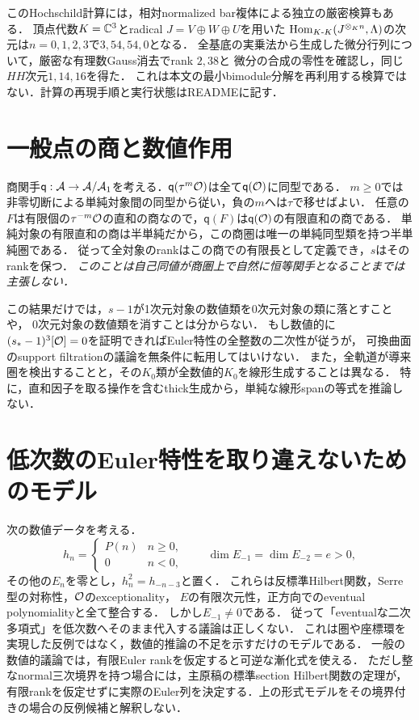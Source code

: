 \documentclass[11pt,a4paper]{ltjsarticle}
\begin{document}
このHochschild計算には，相対normalized bar複体による独立の厳密検算もある．
頂点代数$K=\mathbb C^3$とradical $J=V\oplus W\oplus U$を用いた
$\operatorname{Hom}_{K\text{-}K}(J^{\otimes_K n},\Lambda)$の次元は$n=0,1,2,3$で$3,54,54,0$となる．
全基底の実乗法から生成した微分行列について，厳密な有理数Gauss消去でrank $2,38$と
微分の合成の零性を確認し，同じ$HH$次元$1,14,16$を得た．
これは本文の最小bimodule分解を再利用する検算ではない．計算の再現手順と実行状態はREADMEに記す．


\section{一般点の商と数値作用}
商関手$\mathsf q:\mathcal A\to\mathcal A/\mathcal A_1$を考える．$\mathsf q(\tau^m\mathcal O)$は全て$\mathsf q(\mathcal O)$に同型である．
$m\geq0$では非零切断による単純対象間の同型から従い，負の$m$へは$\tau$で移せばよい．
任意の$F$は有限個の$\tau^{-m}\mathcal O$の直和の商なので，$\mathsf q(F)$は$\mathsf q(\mathcal O)$の有限直和の商である．
単純対象の有限直和の商は半単純だから，この商圏は唯一の単純同型類を持つ半単純圏である．
従って全対象のrankはこの商での有限長として定義でき，$s$はそのrankを保つ．
\emph{このことは自己同値が商圏上で自然に恒等関手となることまでは主張しない．}

この結果だけでは，$s-1$が1次元対象の数値類を0次元対象の類に落とすことや，
0次元対象の数値類を消すことは分からない．
もし数値的に$(s_*-1)^3[\mathcal O]=0$を証明できればEuler特性の全整数の二次性が従うが，
可換曲面のsupport filtrationの議論を無条件に転用してはいけない．
また，全軌道が導来圏を検出することと，その$K_0$類が全数値的$K_0$を線形生成することは異なる．
特に，直和因子を取る操作を含むthick生成から，単純な線形spanの等式を推論しない．

\section{低次数のEuler特性を取り違えないためのモデル}
次の数値データを考える．
\[
 h_n=\begin{cases}P(n)&n\geq0,\\0&n<0,\end{cases}
 \qquad \dim E_{-1}=\dim E_{-2}=e>0,
\]
その他の$E_n$を零とし，$h^2_n=h_{-n-3}$と置く．
これらは反標準Hilbert関数，Serre型の対称性，$\mathcal O$のexceptionality，
$E$の有限次元性，正方向でのeventual polynomialityと全て整合する．
しかし$E_{-1}\ne0$である．
従って「eventualな二次多項式」を低次数へそのまま代入する議論は正しくない．
これは圏や座標環を実現した反例ではなく，数値的推論の不足を示すだけのモデルである．
一般の数値的議論では，有限Euler rankを仮定すると可逆な漸化式を使える．
ただし整なnormal三次境界を持つ場合には，主原稿の標準section Hilbert関数の定理が，
有限rankを仮定せずに実際のEuler列を決定する．上の形式モデルをその境界付きの場合の反例候補と解釈しない．
\end{document}

